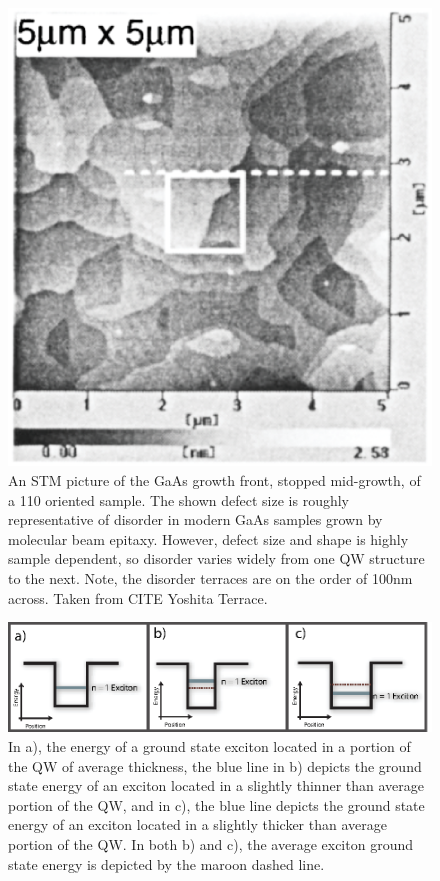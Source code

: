 \begin{figure}[h!]
\label{disorder}
\centering
\includegraphics[width = .4\textwidth]{disorder.eps}
\caption{\doublespacing An STM picture of the GaAs growth front, stopped mid-growth, of a 110 oriented sample. The shown defect size is roughly representative of disorder in modern GaAs samples grown by molecular beam epitaxy. However, defect size and shape is highly sample dependent, so disorder varies widely from one QW structure to the next. Note, the disorder terraces are on the order of 100nm across. Taken from CITE Yoshita Terrace.}
\label{rel}
\end{figure}

\newpage
\begin{figure}[t!]
\label{rel-thickness}
\centering
\includegraphics[width = .9\textwidth]{rel-thickness.eps}
\caption{\doublespacing In a), the energy of a ground state exciton located in a portion of the QW of average thickness, the blue line in b) depicts the ground state energy of an exciton located in a slightly thinner than average portion of the QW,  and in c), the blue line depicts the ground state energy of an exciton located in a slightly thicker than average portion of the QW. In both b) and c), the average exciton ground state energy is depicted by the maroon dashed line.}
\end{figure}




